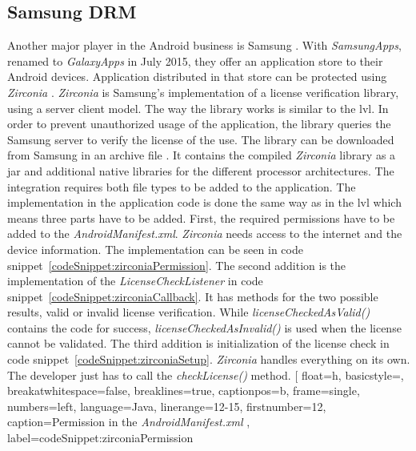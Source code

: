 \subsection{Samsung DRM} \label{section:license-samsung}
Another major player in the Android business is Samsung \cite{comscoreMarket}.
With \textit{SamsungApps}, renamed to \textit{GalaxyApps} in July 2015, they offer an application store to their Android devices.
Application distributed in that store can be protected using \textit{Zirconia} \cite{samsungZirconia}.
\textit{Zirconia} is Samsung’s implementation of a license verification library, using a server client model.
\newline
The way the library works is similar to the \gls{lvl}.
In order to prevent unauthorized usage of the application, the library queries the Samsung server to verify the license of the use.
The library can be downloaded from Samsung in an archive file \cite{samsungZirconia}.
It contains the compiled \textit{Zirconia} library as a \gls{jar} and additional native libraries for the different processor architectures.
The integration requires both file types to be added to the application.
The implementation in the application code is done the same way as in the \gls{lvl} which means three parts have to be added.
\newline
First, the required permissions have to be added to the \textit{AndroidManifest.xml}.
\textit{Zirconia} needs access to the internet and the device information.
The implementation can be seen in code snippet~\ref{codeSnippet:zirconiaPermission}.
\newline
The second addition is the implementation of the \textit{LicenseCheckListener} in code snippet~\ref{codeSnippet:zirconiaCallback}.
It has methods for the two possible results, valid or invalid license verification.
While \textit{licenseCheckedAsValid()} contains the code for success, \textit{licenseCheckedAsInvalid()} is used when the license cannot be validated.
\newline
The third addition is initialization of the license check in code snippet~\ref{codeSnippet:zirconiaSetup}.
\textit{Zirconia} handles everything on its own.
The developer just has to call the \textit{checkLicense()} method.
\newpage
[
  float=h,
  basicstyle=\footnotesize,
  breakatwhitespace=false,
  breaklines=true,
  captionpos=b,
  frame=single,
  numbers=left,
  language=Java,
  linerange={12-15},
  firstnumber=12,
  caption={Permission in the \textit{AndroidManifest.xml} \cite{samsungZirconia}},
  label={codeSnippet:zirconiaPermission}
